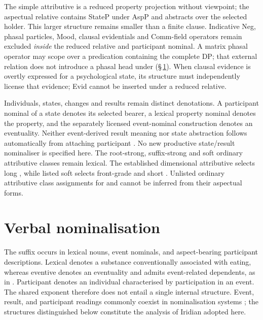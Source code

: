 The simple attributive is a reduced property projection without viewpoint;
the aspectual relative contains StateP under AspP and abstracts over the
selected holder. This larger structure remains smaller than a finite clause.
Indicative Neg, phasal particles, Mood, clausal evidentials and Comm-field
operators remain excluded \emph{inside} the reduced relative and participant
nominal. A matrix phasal operator may scope over a predication containing
the complete DP; that external relation does not introduce a phasal head
under  (§\,\ref{sec:nominalised}). When clausal evidence is overtly expressed for a psychological state, its
structure must independently license that evidence; Evid cannot be inserted
under a reduced relative.

Individuals, states, changes and results remain distinct denotations. A
participant nominal of a state denotes its selected bearer, a lexical property
nominal denotes the property, and the separately licensed event-nominal
construction denotes an eventuality. Neither event-derived result meaning
nor state abstraction follows automatically from attaching participant
. No new productive state/result nominaliser is specified here.
The root-strong, suffix-strong and soft ordinary attributive classes remain
lexical. The established dimensional attributive  selects
long , while listed soft  selects front-grade
 and short . Unlisted ordinary attributive class
assignments for  and  cannot be inferred
from their aspectual forms.

\section{Verbal nominalisation}\label{sec:nominalised}\label{sec:nm-derived}


The suffix  occurs in lexical nouns, event nominals, and
aspect-bearing participant descriptions. Lexical  
denotes a substance conventionally associated with eating, whereas eventive
  denotes an eventuality and admits event-related
dependents, as in  . Participant   denotes an
individual characterised by participation in an event. The shared exponent
therefore does not entail a single internal structure. Event, result, and
participant readings commonly coexist in nominalisation systems
\cite{lieber2018}; the structures distinguished below constitute the analysis
of Iridian adopted here.

